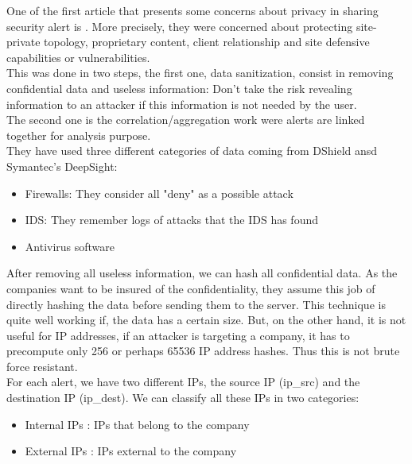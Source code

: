 \documentclass{eplmastersthesis}
\begin{document}
One of the first article that presents some concerns about privacy in sharing security alert is \cite{lincoln2004privacy}.
More precisely, they were concerned about protecting site-private topology, proprietary content, client relationship and site defensive capabilities or vulnerabilities.\\
This was done in two steps, the first one, data sanitization, consist in removing confidential data and useless information: Don't take the risk revealing information to an attacker if this information is not needed by the user.\\
The second one is the correlation/aggregation work were alerts are linked together for analysis purpose.\\
 They have used three different categories of data coming from DShield ansd Symantec's DeepSight:
\begin{itemize}
\item Firewalls: They consider all "deny" as a possible attack
\item IDS: They remember logs of attacks that the IDS has found
\item Antivirus software
\end{itemize}

After removing all useless information, we can hash all confidential data. As the companies want to be insured of the confidentiality, they assume this job of directly hashing the data before sending them to the server.
This technique is quite well working if, the data has a certain size. But, on the other hand, it is not useful for IP addresses, if an attacker is targeting a company, it has to precompute only 256 or perhaps 65536 IP address hashes. Thus this is not brute force resistant.\\
For each alert, we have two different IPs, the source IP (ip\_src) and the destination IP (ip\_dest). We can classify all these IPs in two categories:
\begin{itemize}
	\item Internal IPs : IPs that belong to the company
	\item External IPs : IPs external to the company
\end{itemize}
\end{document}
